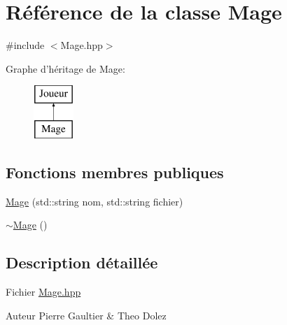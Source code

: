 \hypertarget{class_mage}{\section{Référence de la classe Mage}
\label{class_mage}
}


{\ttfamily \#include $<$Mage.\-hpp$>$}

Graphe d'héritage de Mage\-:\begin{figure}[H]
\begin{center}
\leavevmode
\includegraphics[height=2.000000cm]{class_mage}
\end{center}
\end{figure}
\subsection*{Fonctions membres publiques}
\begin{DoxyCompactItemize}
\item 
\hyperlink{class_mage_afd12913f92aeb59dceb83ad1d6753ae9}{Mage} (std\-::string nom, std\-::string fichier)
\item 
\hyperlink{class_mage_a0a3f693b67379cde4fcf2fa1622211ca}{$\sim$\-Mage} ()
\end{DoxyCompactItemize}


\subsection{Description détaillée}
Fichier \hyperlink{_mage_8hpp}{Mage.\-hpp} \begin{DoxyAuthor}{Auteur}
Pierre Gaultier \& Theo Dolez 
\end{DoxyAuthor}


